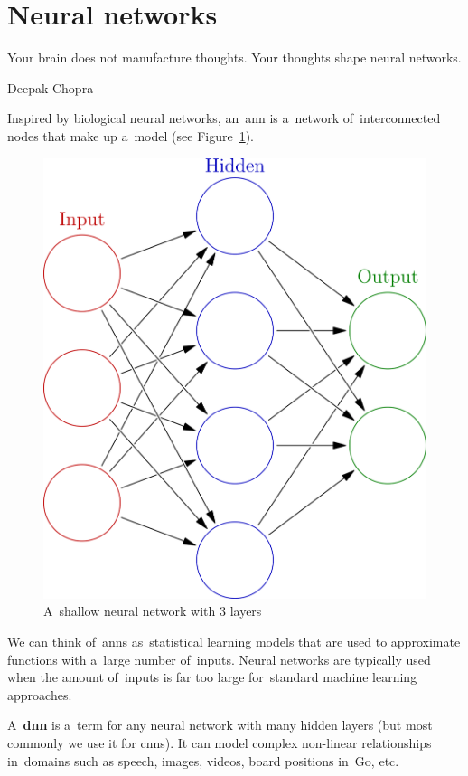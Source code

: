 \section{Neural networks}
\epigraph{
  Your brain does not manufacture thoughts.
  Your thoughts shape neural networks.
}{Deepak Chopra}
Inspired by biological neural networks, an~\acrfull{ann} is a~network of~interconnected nodes that make up a~model (see Figure~\ref{fig:shallow-neural-network}).
\begin{figure}[H]
  \centering
  \includegraphics[height=.2\textheight]{../img/colored_neural_network.png}
  \caption{A~shallow neural network with 3 layers}
  \label{fig:shallow-neural-network}
\end{figure}

We can think of~\acrshort{ann}s as~statistical learning models that are used to approximate functions with a~large number of~inputs.
Neural networks are typically used when the amount of~inputs is far too large for~standard machine learning approaches.

A~\textbf{\acrfull{dnn}} is a~term for any neural network with many hidden layers (but most commonly we use it for \acrlong{cnn}s).
It can model complex non-linear relationships in~domains such as speech, images, videos, board positions in~Go, etc.

